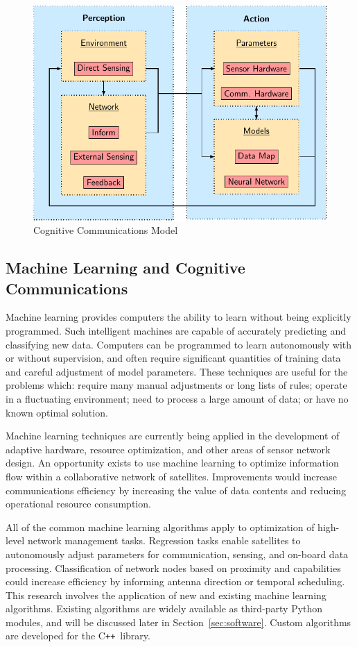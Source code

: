 \documentclass[conference]{IEEEtran}
\newcommand{\cpp}{C\texttt{++}~}
\begin{document}
\begin{figure}[t]
  \centerline{\includegraphics[width=0.9\linewidth]
    {images/working/flowchart.pdf}
  }
  \caption{Cognitive Communications Model}
  \label{fig:model}
\end{figure}

\subsection{Machine Learning and Cognitive Communications}
\label{ssec:ml}

Machine learning provides computers the ability to learn without being explicitly programmed.  Such intelligent machines are capable of accurately predicting and classifying new data.  Computers can be programmed to learn autonomously with or without supervision, and often require significant quantities of training data and careful adjustment of model parameters.  These techniques are useful for the problems which: require many manual adjustments or long lists of rules; operate in a fluctuating environment; need to process a large amount of data; or have no known optimal solution.

Machine learning techniques are currently being applied in the development of adaptive hardware, resource optimization, and other areas of sensor network design.  An opportunity exists to use machine learning to optimize information flow within a collaborative network of satellites.  Improvements would increase communications efficiency by increasing the value of data contents and reducing operational resource consumption.

All of the common machine learning algorithms apply to optimization of high-level network management tasks.  Regression tasks enable satellites to autonomously adjust parameters for communication, sensing, and on-board data processing.  Classification of network nodes based on proximity and capabilities could increase efficiency by informing antenna direction or temporal scheduling.  This research involves the application of new and existing machine learning algorithms.  Existing algorithms are widely available as third-party Python modules, and will be discussed later in Section~\ref{sec:software}.  Custom algorithms are developed for the \cpp library.
\end{document}

